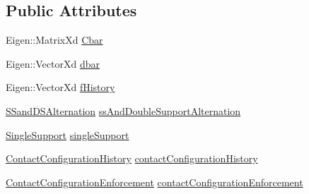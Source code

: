 \subsection*{\-Public \-Attributes}
\begin{DoxyCompactItemize}
\item 
\-Eigen\-::\-Matrix\-Xd \hyperlink{structAdmissibilityConstraintsStruct_a98a5ca7c248a90da7503646cc79476e3}{\-Cbar}
\item 
\-Eigen\-::\-Vector\-Xd \hyperlink{structAdmissibilityConstraintsStruct_a9db3c58cd73ef8ef0bb74f71ae9bb225}{dbar}
\item 
\-Eigen\-::\-Vector\-Xd \hyperlink{structAdmissibilityConstraintsStruct_adadbcf470bb052caccee15b81000684a}{f\-History}
\item 
\hyperlink{structAdmissibilityConstraintsStruct_1_1SSandDSAlternation}{\-S\-Sand\-D\-S\-Alternation} \hyperlink{structAdmissibilityConstraintsStruct_a387b2106272e3148e1fd4dbde6dedb3e}{ss\-And\-Double\-Support\-Alternation}
\item 
\hyperlink{structAdmissibilityConstraintsStruct_1_1SingleSupport}{\-Single\-Support} \hyperlink{structAdmissibilityConstraintsStruct_a40fb404909b4fcee9e31e1dbf566a554}{single\-Support}
\item 
\hyperlink{structAdmissibilityConstraintsStruct_1_1ContactConfigurationHistory}{\-Contact\-Configuration\-History} \hyperlink{structAdmissibilityConstraintsStruct_a1869779fd2f2d7a1a3d352ddb783052d}{contact\-Configuration\-History}
\item 
\hyperlink{structAdmissibilityConstraintsStruct_1_1ContactConfigurationEnforcement}{\-Contact\-Configuration\-Enforcement} \hyperlink{structAdmissibilityConstraintsStruct_af002ab19787c812e98ed8fbff1f1cae5}{contact\-Configuration\-Enforcement}
\end{DoxyCompactItemize}


